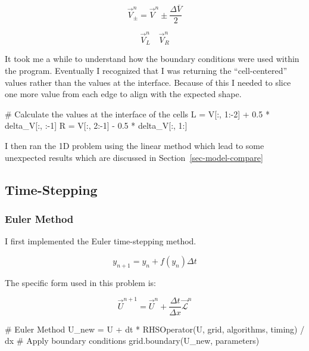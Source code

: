 \documentclass[
  letterpaper,
]{article}
\newenvironment{Shaded}{\begin{snugshade}}{\end{snugshade}}
\newcommand{\CommentTok}[1]{\textcolor[rgb]{0.37,0.37,0.37}{#1}}
\newcommand{\DecValTok}[1]{\textcolor[rgb]{0.68,0.00,0.00}{#1}}
\newcommand{\FloatTok}[1]{\textcolor[rgb]{0.68,0.00,0.00}{#1}}
\newcommand{\NormalTok}[1]{\textcolor[rgb]{0.00,0.23,0.31}{#1}}
\newcommand{\OperatorTok}[1]{\textcolor[rgb]{0.37,0.37,0.37}{#1}}
\begin{document}
\[
\vec{V}^{n}_{\pm} = \vec{V}^{n} \pm \frac{\Delta \overline{V}}{2}
\]

\[
\vec{V}^{n}_{L} \quad \vec{V}^{n}_{R}
\]

It took me a while to understand how the boundary conditions were used
within the program. Eventually I recognized that I was returning the
``cell-centered'' values rather than the values at the interface.
Because of this I needed to slice one more value from each edge to align
with the expected shape.

\begin{Shaded}
\begin{Highlighting}[]
\CommentTok{\# Calculate the values at the interface of the cells}
\NormalTok{L }\OperatorTok{=}\NormalTok{ V[:, }\DecValTok{1}\NormalTok{:}\OperatorTok{{-}}\DecValTok{2}\NormalTok{] }\OperatorTok{+} \FloatTok{0.5} \OperatorTok{*}\NormalTok{ delta\_V[:, :}\OperatorTok{{-}}\DecValTok{1}\NormalTok{]}
\NormalTok{R }\OperatorTok{=}\NormalTok{ V[:, }\DecValTok{2}\NormalTok{:}\OperatorTok{{-}}\DecValTok{1}\NormalTok{] }\OperatorTok{{-}} \FloatTok{0.5} \OperatorTok{*}\NormalTok{ delta\_V[:, }\DecValTok{1}\NormalTok{:]}
\end{Highlighting}
\end{Shaded}

I then ran the 1D problem using the linear method which lead to some
unexpected results which are discussed in
Section~\ref{sec-model-compare}

\subsection{Time-Stepping}\label{time-stepping}

\subsubsection{Euler Method}\label{euler-method}

I first implemented the Euler time-stepping method.

\[
y_{n+1} = y_{n} + f(y_{n}) \Delta t
\]

The specific form used in this problem is:

\[
\vec{U}^{n+1} = \vec{U}^{n} + \frac{\Delta t}{\Delta x} \vec{\mathcal{L}}^{n}
\]

\begin{Shaded}
\begin{Highlighting}[]
\CommentTok{\# Euler Method}
\NormalTok{U\_new }\OperatorTok{=}\NormalTok{ U }\OperatorTok{+}\NormalTok{ dt }\OperatorTok{*}\NormalTok{ RHSOperator(U, grid, algorithms, timing) }\OperatorTok{/}\NormalTok{ dx}
\CommentTok{\# Apply boundary conditions}
\NormalTok{grid.boundary(U\_new, parameters)}
\end{Highlighting}
\end{Shaded}
\end{document}

